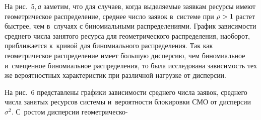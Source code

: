 \begin{multicols}{2}
  
  
  
  На рис.~5,\,\textit{а} заметим, что для случаев, когда выделяемые заявкам ресурсы 
имеют геометрическое распределение, среднее число заявок в~системе при 
$\rho\hm>1$ растет быстрее, чем в~случаях с биномиальными распределениями. 
График зависимости среднего числа занятого ресурса для геометрического 
распределения, наоборот, приближается к~кривой для биномиального 
распределения. Так как геометрическое распределение имеет б$\acute{\mbox{о}}$льшую 
дисперсию, чем биномиальное и~смещенное биномиальное распределения, то 
была исследована зависимость тех же вероятностных характеристик при 
различной нагрузке от дисперсии.
  
  На рис.~6 представлены графики зависи\-мости среднего числа заявок, 
среднего числа занятых ресурсов системы и~вероятности блокировки СМО от 
дисперсии~$\sigma^2$. С~ростом дисперсии гео\-мет\-ри\-че\-ско-\linebreak\vspace*{-12pt}

\pagebreak

\setcounter{figure}{4}

\end{multicols}

 \begin{figure} %
 \vspace*{1pt}
 \begin{center}
 \mbox{%
 \epsfxsize=162mm
 }
 \end{center}
 \vspace*{-16pt}
\begin{minipage}[t]{80mm}
\end{minipage}
\hfill
\begin{minipage}[t]{80mm}
\end{minipage}
\vspace*{-4pt}
\end{figure}
 

